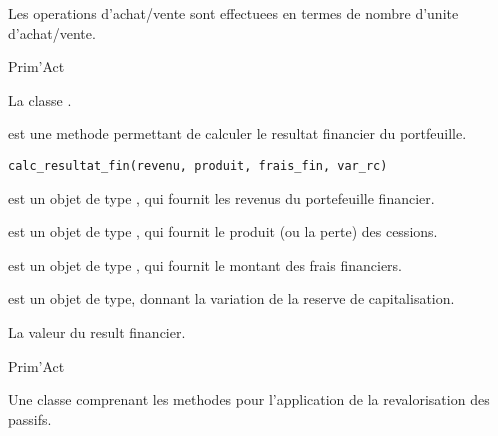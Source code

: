 \documentclass[a4paper]{book}
\begin{document}
%
\begin{Note}\relax
Les operations d'achat/vente sont effectuees en termes de nombre d'unite d'achat/vente.
\end{Note}
%
\begin{Author}\relax
Prim'Act
\end{Author}
%
\begin{SeeAlso}\relax
La classe .
\end{SeeAlso}
%
\begin{Description}\relax
{} est une methode permettant de calculer le resultat financier du portfeuille.
\end{Description}
%
\begin{Usage}
\begin{verbatim}
calc_resultat_fin(revenu, produit, frais_fin, var_rc)
\end{verbatim}
\end{Usage}
%
\begin{Arguments}
\begin{ldescription}
\item[\code{revenu}] est un objet de type , qui fournit les revenus du portefeuille financier.

\item[\code{produit}] est un objet de type , qui fournit le produit (ou la perte) des cessions.

\item[\code{frais\_fin}] est un objet de type , qui fournit le montant des frais financiers.

\item[\code{var\_rc}] est un objet de type, donnant la variation de la reserve de capitalisation.
\end{ldescription}
\end{Arguments}
%
\begin{Value}
La valeur du result financier.
\end{Value}
%
\begin{Author}\relax
Prim'Act
\end{Author}
%
\begin{Description}\relax
Une classe comprenant les methodes pour l'application de la revalorisation des passifs.
\end{Description}
\end{document}
